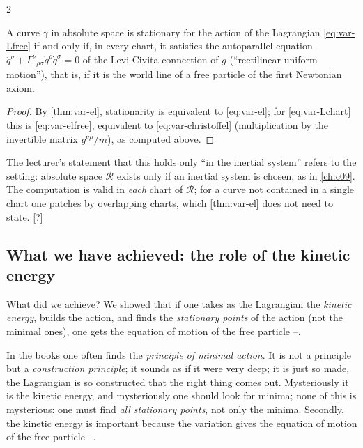\begin{paracol}{2}
\begin{theorem}[The stationary curves of $L=\tfrac12mg(X,X)$ are the free motions]\label{thm:var-free}
A curve $\gamma$ in absolute space is stationary for the action of the Lagrangian \eqref{eq:var-Lfree} if and only if, in every chart, it satisfies the autoparallel equation $\ddot q^\nu+\Gamma^\nu{}_{\rho\sigma}\dot q^\rho\dot q^\sigma=0$ of the Levi-Civita connection of $g$ (``rectilinear uniform motion''), that is, if it is the world line of a free particle of the first Newtonian axiom.
\end{theorem}
\begin{proof}
By \cref{thm:var-el}, stationarity is equivalent to \eqref{eq:var-el}; for \eqref{eq:var-Lchart} this is \eqref{eq:var-elfree}, equivalent to \eqref{eq:var-christoffel} (multiplication by the invertible matrix $g^{\nu\mu}/m$), as computed above. \qedhere
\end{proof}

\begin{coursenote}\label{cn:var-caveat}
The lecturer's statement that this holds only ``in the inertial system'' refers to the setting: absolute space $\mathcal R$ exists only if an inertial system is chosen, as in \cref{ch:c09}. The computation is valid in \emph{each} chart of $\mathcal R$; for a curve not contained in a single chart one patches by overlapping charts, which \cref{thm:var-el} does not need to state. [?]
\end{coursenote}

\subsection{What we have achieved: the role of the kinetic energy}\label{ssec:var-achieved}

What did we achieve? We showed that if one takes as the Lagrangian the \emph{kinetic energy}, builds the action, and finds the \emph{stationary points} of the action (not the minimal ones), one gets the equation of motion of the free particle --.

\begin{coursenote}\label{cn:var-minimal}
In the books one often finds the \emph{principle of minimal action}. It is not a principle but a \emph{construction principle}; it sounds as if it were very deep; it is just so made, the Lagrangian is so constructed that the right thing comes out. Mysteriously it is the kinetic energy, and mysteriously one should look for minima; none of this is mysterious: one must find \emph{all stationary points}, not only the minima. Secondly, the kinetic energy is important because the variation gives the equation of motion of the free particle --.
\end{coursenote}


\end{paracol}
